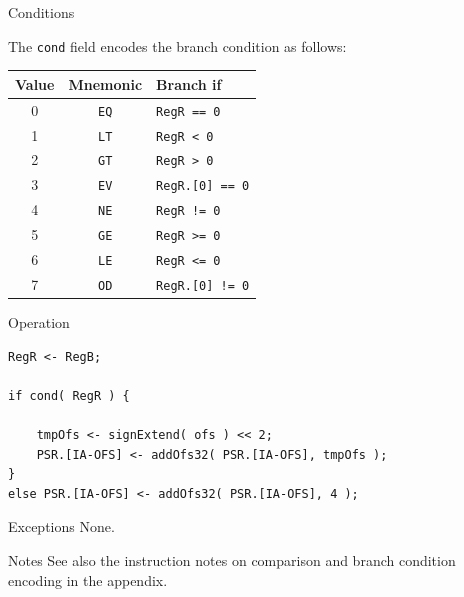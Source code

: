 \begin{iPageDescEntry}{Conditions}

The \texttt{cond} field encodes the branch condition as follows:

\begin{flushleft}
\begin{tabular}{|c|c|l|}
\hline
\textbf{Value} & \textbf{Mnemonic} & \textbf{Branch if} \\ \hline
0 & \texttt{EQ} & \texttt{RegR == 0} \\ \hline
1 & \texttt{LT} & \texttt{RegR <  0}  \\ \hline
2 & \texttt{GT} & \texttt{RegR >  0} \\ \hline
3 & \texttt{EV} & \texttt{RegR.[0] == 0} \\ \hline
4 & \texttt{NE} & \texttt{RegR != 0} \\ \hline
5 & \texttt{GE} & \texttt{RegR >= 0} \\ \hline
6 & \texttt{LE} & \texttt{RegR <= 0}  \\ \hline
7 & \texttt{OD} & \texttt{RegR.[0] != 0} \\ \hline
\end{tabular}
\end{flushleft}

\end{iPageDescEntry}

\begin{iPageDescOpEntry}{Operation}
\begin{lstlisting}[style=iPageOpStyle]
RegR <- RegB;

if cond( RegR ) {

    tmpOfs <- signExtend( ofs ) << 2;
    PSR.[IA-OFS] <- addOfs32( PSR.[IA-OFS], tmpOfs );
}
else PSR.[IA-OFS] <- addOfs32( PSR.[IA-OFS], 4 );
\end{lstlisting}
\end{iPageDescOpEntry}

\begin{iPageDescEntry}{Exceptions}
None.
\end{iPageDescEntry}

\begin{iPageDescEntry}{Notes}
See also the instruction notes on comparison and branch condition encoding in the appendix.
\end{iPageDescEntry}


